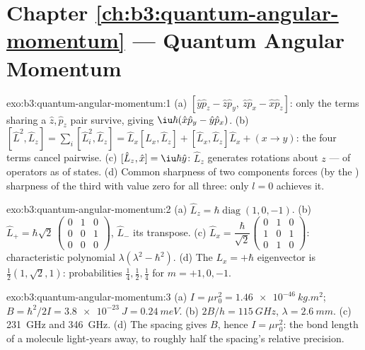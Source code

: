 \section*{Chapter \ref{ch:b3:quantum-angular-momentum} --- Quantum Angular Momentum}

\begin{solution}{exo:b3:quantum-angular-momentum:1}
(a) $[\hat y\hat p_z - \hat z\hat p_y,\ \hat z\hat p_x - \hat x\hat
p_z]$: only the terms sharing a $\hat z, \hat p_z$ pair survive,
giving $\iu\hbar(\hat x\hat p_y - \hat y\hat p_x)$. (b) $[\hat
L^2, \hat L_z] = \sum_i[\hat L_i^2, \hat L_z] = \hat L_x[\hat L_x,
\hat L_z] + [\hat L_x, \hat L_z]\hat L_x + (x \to y)$: the four
terms cancel pairwise. (c) $[\hat L_z, \hat x] = \iu\hbar\hat y$:
$\hat L_z$ generates rotations about $z$ --- of operators as of
states. (d) Common sharpness of two components forces (by the
) sharpness of the third with value zero for all three:
only $l = 0$ achieves it.
\end{solution}

\begin{solution}{exo:b3:quantum-angular-momentum:2}
(a) $\hat L_z = \hbar\operatorname{diag}(1, 0, -1)$. (b) $\hat L_+ =
\hbar\sqrt2\,\begin{pmatrix}0&1&0\\0&0&1\\0&0&0
\end{pmatrix}$, $\hat L_-$ its transpose. (c) $\hat L_x =
\dfrac{\hbar}{\sqrt2}\begin{pmatrix}0&1&0\\1&0&1\\0&1&0
\end{pmatrix}$: characteristic polynomial $\lambda(\lambda^2 -
\hbar^2)$. (d) The $L_x = +\hbar$ eigenvector is $\tfrac12(1,
\sqrt2, 1)$: probabilities $\tfrac14, \tfrac12, \tfrac14$ for $m =
+1, 0, -1$.
\end{solution}

\begin{solution}{exo:b3:quantum-angular-momentum:3}
(a) $I = \mu r_0^2 = \qty{1.46e-46}{kg.m^2}$; $B = \hbar^2/2I =
\qty{3.8e-23}{J} = \qty{0.24}{meV}$. (b) $2B/h = \qty{115}{GHz}$,
$\lambda = \qty{2.6}{mm}$. (c) \qty{231}{GHz} and \qty{346}{GHz}.
(d) The spacing gives $B$, hence $I = \mu r_0^2$: the bond length of
a molecule light-years away, to roughly half the spacing's relative
precision.
\end{solution}

